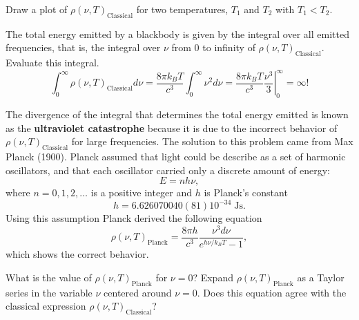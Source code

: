 \documentclass[../Main/chem331-notes.tex]{subfiles}
\begin{document}
\begin{exercise}
Draw a plot of $\rho(\nu,T)_\mathrm{Classical}$ for two temperatures, $T_1$ and $T_2$ with $T_1 < T_2$.
\end{exercise}
\begin{exercise}
The total energy emitted by a blackbody is given by the integral over all emitted frequencies, that is, the integral over $\nu$ from 0 to infinity of $\rho(\nu,T)_\mathrm{Classical}$.
Evaluate this integral.
\begin{equation}
\int_0^\infty \rho(\nu,T)_\mathrm{Classical} d\nu 
= \frac{8 \pi k_B T}{c^3} \int_0^\infty  \nu^2 d\nu
= \frac{8 \pi k_B T}{c^3} \left.  \frac{\nu^3}{3}  \right|_0^\infty = \infty !
\end{equation}
\end{exercise}

The divergence of the integral that determines the total energy emitted is known as the \textbf{ultraviolet catastrophe} because it is due to the incorrect behavior of $\rho(\nu,T)_\mathrm{Classical}$ for large frequencies.
The solution to this problem came from Max Planck (1900).
Planck assumed that light could be describe as a set of harmonic oscillators, and that each oscillator carried only a discrete amount of energy:
\begin{equation}
E = n h \nu,
\end{equation}
where $n = 0, 1, 2, \ldots$ is a positive integer and $h$ is Planck's constant
\begin{equation}
h = 6.626070040(81) 10^{-34}\;\si{\joule\second}.
\end{equation}
Using this assumption Planck derived the following equation
\begin{equation}
\rho(\nu,T)_\mathrm{Planck} =  \frac{8 \pi h}{c^3} \frac{\nu^3 d\nu}{e^{h\nu/k_B T} -1},
\end{equation}
which shows the correct behavior.

\begin{exercise}
What is the value of $\rho(\nu,T)_\mathrm{Planck}$ for $\nu = 0$?
Expand $\rho(\nu,T)_\mathrm{Planck}$ as a Taylor series in the variable $\nu$ centered around $\nu = 0$.
Does this equation agree with the classical expression $\rho(\nu,T)_\mathrm{Classical}$?
\end{exercise}
\end{document}

